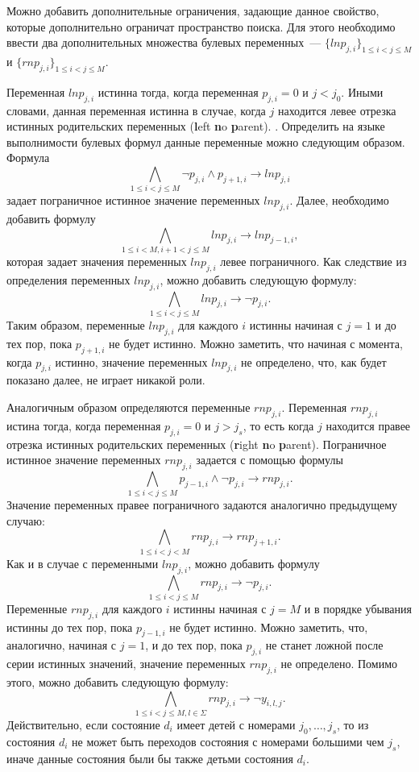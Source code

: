 Можно добавить дополнительные ограничения, задающие данное свойство, которые дополнительно ограничат пространство поиска.
Для этого необходимо ввести два дополнительных множества булевых переменных~{---} $\{\mathit{lnp}_{j,i}\}_{1 \leq i < j \leq M}$ и  $\{\mathit{rnp}_{j,i}\}_{1 \leq i < j \leq M}$.

Переменная $\mathit{lnp}_{j,i}$ истинна тогда, когда переменная $p_{j,i} = 0$ и $j < j_{0}$.
Иными словами, данная переменная истинна в случае, когда $j$ находится левее отрезка истинных родительских переменных (\textbf{l}eft \textbf{n}o \textbf{p}arent).
.
Определить на языке выполнимости булевых формул данные переменные можно следующим образом.
Формула $$\bigwedge_{1 \leq i < j \leq M} \neg p_{j,i} \wedge p_{j + 1, i} \rightarrow \mathit{lnp}_{j,i}$$ задает пограничное истинное значение переменных $\mathit{lnp}_{j,i}$.
Далее, необходимо добавить формулу $$\bigwedge_{1 \leq i < M, i + 1 < j \leq M} \mathit{lnp}_{j,i} \rightarrow \mathit{lnp}_{j - 1, i},$$
которая задает значения переменных $\mathit{lnp}_{j,i}$ левее пограничного.
Как следствие из определения переменных $\mathit{lnp}_{j,i}$, можно добавить следующую формулу: $$\bigwedge_{1 \leq i < j \leq M} \mathit{lnp}_{j,i} \rightarrow \neg p_{j,i}.$$
Таким образом, переменные $\mathit{lnp}_{j,i}$ для каждого $i$ истинны начиная с $j = 1$ и до тех пор, пока $p_{j + 1, i}$ не будет истинно.
Можно заметить, что начиная с момента, когда $p_{j,i}$ истинно, значение переменных $\mathit{lnp}_{j,i}$ не определено, что, как будет показано далее, не играет никакой роли.

Аналогичным образом определяются переменные $\mathit{rnp}_{j,i}$.
Переменная $\mathit{rnp}_{j,i}$ истина тогда, когда переменная $p_{j,i} = 0$ и $j > j_{s}$, то есть когда $j$ находится правее отрезка истинных родительских переменных (\textbf{r}ight \textbf{n}o \textbf{p}arent).
Пограничное истинное значение переменных $\mathit{rnp}_{j,i}$ задается с помощью формулы $$\bigwedge_{1 \leq i < j \leq M} p_{j - 1,i} \wedge \neg p_{j, i} \rightarrow \mathit{rnp}_{j,i}.$$
Значение переменных правее пограничного задаются аналогично предыдущему случаю: $$\bigwedge_{1 \leq i < j < M} \mathit{rnp}_{j,i} \rightarrow \mathit{rnp}_{j + 1, i}.$$
Как и в случае с переменными $\mathit{lnp}_{j,i}$, можно добавить формулу $$\bigwedge_{1 \leq i < j \leq M} \mathit{rnp}_{j,i} \rightarrow \neg p_{j,i}.$$
Переменные $\mathit{rnp}_{j,i}$ для каждого $i$ истинны начиная с $j = M$ и в порядке убывания истинны до тех пор, пока $p_{j - 1, i}$ не будет истинно.
Можно заметить, что, аналогично, начиная с $j = 1$, и до тех пор, пока $p_{j,i}$ не станет ложной после серии истинных значений, значение переменных $\mathit{rnp}_{j,i}$ не определено.
Помимо этого, можно добавить следующую формулу: $$\bigwedge_{1 \leq i < j \leq M, l \in \Sigma} \mathit{rnp}_{j,i} \rightarrow \neg y_{i,l,j}.$$
Действительно, если состояние $d_{i}$ имеет детей с номерами $j_{0},\ldots,j_{s}$, то из состояния $d_{i}$ не может быть переходов состояния с номерами б\emph{о}льшими чем $j_{s}$, иначе данные состояния были бы также детьми состояния $d_{i}$. 

